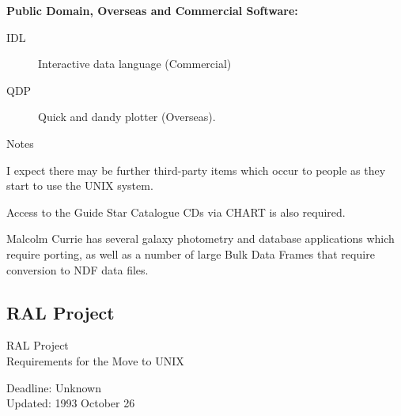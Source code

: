 \newpage
\vspace{5mm}
\begin{center}
{\bf Public Domain, Overseas and Commercial Software:}
\end{center}

\begin{description}
\item[IDL] Interactive data language (Commercial)
\item[QDP] Quick and dandy plotter (Overseas).
\end{description}


\vspace{5mm}
\begin{center}
{\large\sc Notes}
\end{center}

I expect there may be further third-party items which occur to people as they 
start to use the UNIX system.

Access to the Guide Star Catalogue CDs via CHART is also required.

Malcolm Currie has several galaxy photometry and database applications which
require porting, as well as a number of large Bulk Data Frames that require
conversion to NDF data files.


\newpage
\subsection{RAL Project}

\renewcommand{\starsitename}{RAL Project}
\renewcommand{\starnodename}{RLVAD}

\renewcommand{\starunixdate}{Unknown}
\renewcommand{\starupdate}{1993 October 26}

\renewcommand{\starsitetelephone}{0235 821900}
\renewcommand{\starsitefax}{0235 445848}

\begin{center}
{\Large\sc \starsitename \\ [2ex]
           Requirements for the Move to UNIX}

\vspace{3mm}
{\large\sc Deadline: \starunixdate \\ [1ex]
           Updated: \starupdate}
\end{center}

\vspace{5mm}


